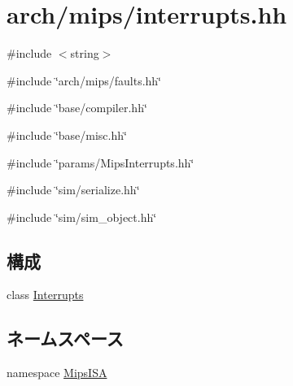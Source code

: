 \hypertarget{mips_2interrupts_8hh}{
\section{arch/mips/interrupts.hh}
\label{mips_2interrupts_8hh}
}
{\ttfamily \#include $<$string$>$}\par
{\ttfamily \#include \char`\"{}arch/mips/faults.hh\char`\"{}}\par
{\ttfamily \#include \char`\"{}base/compiler.hh\char`\"{}}\par
{\ttfamily \#include \char`\"{}base/misc.hh\char`\"{}}\par
{\ttfamily \#include \char`\"{}params/MipsInterrupts.hh\char`\"{}}\par
{\ttfamily \#include \char`\"{}sim/serialize.hh\char`\"{}}\par
{\ttfamily \#include \char`\"{}sim/sim\_\-object.hh\char`\"{}}\par
\subsection*{構成}
\begin{DoxyCompactItemize}
\item 
class \hyperlink{classMipsISA_1_1Interrupts}{Interrupts}
\end{DoxyCompactItemize}
\subsection*{ネームスペース}
\begin{DoxyCompactItemize}
\item 
namespace \hyperlink{namespaceMipsISA}{MipsISA}
\end{DoxyCompactItemize}
